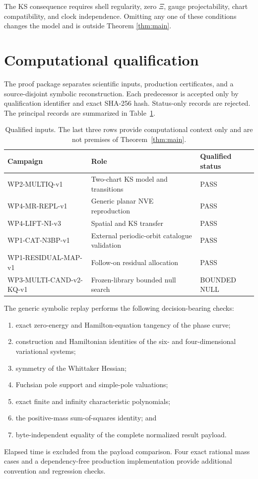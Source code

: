 \documentclass[11pt]{article}
\theoremstyle{definition}
\theoremstyle{remark}
\newcommand{\XiMap}{\Xi}
\begin{document}
The KS consequence requires shell regularity, zero \(\XiMap\), gauge
projectability, chart compatibility, and clock independence.  Omitting any
one of these conditions changes the model and is outside Theorem
\ref{thm:main}.

\section{Computational qualification}
\label{sec:qualification}

The proof package separates scientific inputs, production certificates, and
a source-disjoint symbolic reconstruction.  Each predecessor is accepted
only by qualification identifier and exact SHA-256 hash.  Status-only
records are rejected.  The principal records are summarized in
Table~\ref{tab:records}.

\begin{table}[htbp]
\centering
\small
\begin{tabular}{@{}lll@{}}
\toprule
Campaign & Role & Qualified status\\
\midrule
WP2-MULTIQ-v1 & Two-chart KS model and transitions & PASS\\
WP4-MR-REPL-v1 & Generic planar NVE reproduction & PASS\\
WP4-LIFT-NI-v3 & Spatial and KS transfer & PASS\\
WP1-CAT-N3BP-v1 & External periodic-orbit catalogue validation & PASS\\
WP1-RESIDUAL-MAP-v1 & Follow-on residual allocation & PASS\\
WP3-MULTI-CAND-v2-KQ-v1 & Frozen-library bounded null search & BOUNDED NULL\\
\bottomrule
\end{tabular}
\caption{Qualified inputs.  The last three rows provide computational
context only and are not premises of Theorem~\ref{thm:main}.}
\label{tab:records}
\end{table}

The generic symbolic replay performs the following decision-bearing checks:
\begin{enumerate}
  \item exact zero-energy and Hamilton-equation tangency of the phase curve;
  \item construction and Hamiltonian identities of the six- and
    four-dimensional variational systems;
  \item symmetry of the Whittaker Hessian;
  \item Fuchsian pole support and simple-pole valuations;
  \item exact finite and infinity characteristic polynomials;
  \item the positive-mass sum-of-squares identity; and
  \item byte-independent equality of the complete normalized result payload.
\end{enumerate}
Elapsed time is excluded from the payload comparison.  Four exact rational
mass cases and a dependency-free production implementation provide
additional convention and regression checks.
\end{document}
